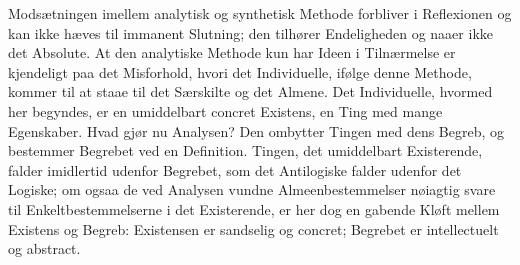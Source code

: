 \documentclass[12pt]{book}
\newcommand{\opage}[1]{\marginnote{\footnotesize\textit{[#1]}}}
\begin{document}
\opage{372}Modsætningen imellem analytisk og synthetisk Methode forbliver i Reflexionen og kan ikke hæves til immanent Slutning; den tilhører Endeligheden og naaer ikke det Absolute. At den analytiske Methode kun har Ideen i Tilnærmelse er kjendeligt paa det Misforhold, hvori det Individuelle, ifølge denne Methode, kommer til at staae til det Særskilte og det Almene. Det Individuelle, hvormed her begyndes, er en umiddelbart concret Existens, en Ting med mange Egenskaber. Hvad gjør nu Analysen? Den ombytter Tingen med dens Begreb, og bestemmer Begrebet ved en Definition. Tingen, det umiddelbart Existerende, falder imidlertid udenfor Begrebet, som det Antilogiske falder udenfor det Logiske; om ogsaa de ved Analysen vundne Almeenbestemmelser nøiagtig svare til Enkeltbestemmelserne i det Existerende, er her dog en gabende Kløft mellem Existens og Begreb: Existensen er sandselig og concret; Begrebet er intellectuelt og abstract.
\end{document}
